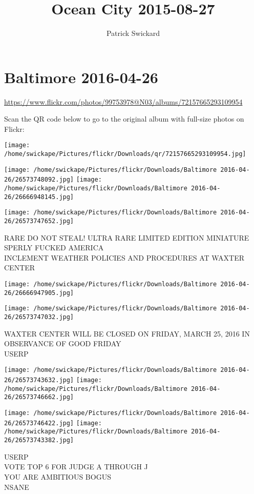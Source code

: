 \documentclass[10pt,letterpaper]{article}
\title{Ocean City 2015-08-27}
\author{Patrick Swickard}
\date{}
\begin{document}
\section*{Baltimore 2016-04-26}

\url{https://www.flickr.com/photos/99753978@N03/albums/72157665293109954}

Scan the QR code below to go to the original album with full-size photos on Flickr:

\texttt{[image: /home/swickape/Pictures/flickr/Downloads/qr/72157665293109954.jpg]}
\pagebreak

\texttt{[image: /home/swickape/Pictures/flickr/Downloads/Baltimore 2016-04-26/26573748092.jpg]}
\texttt{[image: /home/swickape/Pictures/flickr/Downloads/Baltimore 2016-04-26/26666948145.jpg]}

\texttt{[image: /home/swickape/Pictures/flickr/Downloads/Baltimore 2016-04-26/26573747652.jpg]}

RARE DO NOT STEAL!  ULTRA RARE LIMITED EDITION MINIATURE\\
SPERLY FUCKED AMERICA\\
INCLEMENT WEATHER POLICIES AND PROCEDURES AT WAXTER CENTER
\pagebreak

\texttt{[image: /home/swickape/Pictures/flickr/Downloads/Baltimore 2016-04-26/26666947905.jpg]}

\vspace{0.25in}
\texttt{[image: /home/swickape/Pictures/flickr/Downloads/Baltimore 2016-04-26/26573747032.jpg]}

WAXTER CENTER WILL BE CLOSED ON FRIDAY, MARCH 25, 2016 IN OBSERVANCE OF GOOD FRIDAY\\
USERP
\pagebreak

\texttt{[image: /home/swickape/Pictures/flickr/Downloads/Baltimore 2016-04-26/26573743632.jpg]}
\texttt{[image: /home/swickape/Pictures/flickr/Downloads/Baltimore 2016-04-26/26573746662.jpg]}

\texttt{[image: /home/swickape/Pictures/flickr/Downloads/Baltimore 2016-04-26/26573746422.jpg]}
\texttt{[image: /home/swickape/Pictures/flickr/Downloads/Baltimore 2016-04-26/26573743382.jpg]}

USERP\\
VOTE TOP 6 FOR JUDGE A THROUGH J\\
YOU ARE AMBITIOUS BOGUS\\
NSANE
\pagebreak
\end{document}
